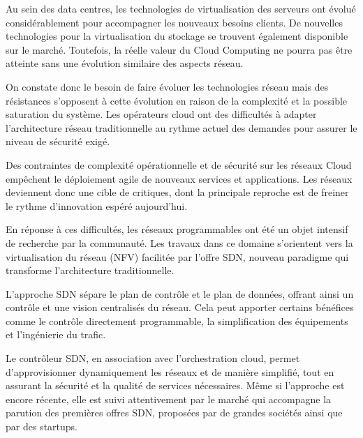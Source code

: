 

Au sein des data centres, les technologies de virtualisation des serveurs ont évolué considérablement pour accompagner les nouveaux besoins clients. De nouvelles technologies pour la virtualisation du stockage se trouvent également disponible sur le marché. Toutefois, la réelle valeur du Cloud Computing ne pourra pas être atteinte sans une évolution similaire des aspects réseau.

On constate donc le besoin de faire évoluer les technologies réseau mais des résistances s'opposent à cette évolution en raison de la complexité et la possible saturation du système. Les opérateurs cloud ont des difficultés à adapter l'architecture réseau traditionnelle au rythme actuel des demandes pour assurer le niveau de sécurité exigé.

Des contraintes de complexité opérationnelle et de sécurité sur les réseaux Cloud empêchent le déploiement agile de nouveaux services et applications. Les réseaux deviennent donc une cible de critiques, dont la principale reproche est de freiner le rythme d'innovation espéré aujourd'hui.

En réponse à ces difficultés, les réseaux programmables ont été un objet intensif de recherche par la communauté. Les travaux dans ce domaine s'orientent vers la virtualisation du réseau (NFV) facilitée par l'offre SDN, nouveau paradigme qui transforme l'architecture traditionnelle. 

L'approche SDN sépare le plan de contrôle et le plan de données, offrant ainsi un contrôle et une vision centralisés du réseau. Cela peut apporter certains bénéfices comme le contrôle directement programmable, la simplification des équipements et l'ingénierie du trafic. %


Le contrôleur SDN, en association avec l'orchestration cloud, permet d'approvisionner dynamiquement les réseaux et de manière simplifié, tout en assurant la sécurité et la qualité de services nécessaires. Même si l'approche est encore récente, elle est suivi attentivement par le marché qui accompagne la parution des premières offres SDN, proposées par de grandes sociétés ainsi que par des startups.



